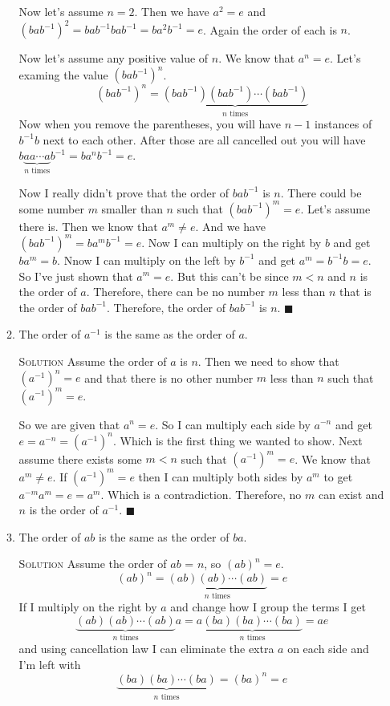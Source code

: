 \documentclass[twoside]{amsart}
\newcommand{\solution}{\textsc{Solution}\xspace}
\newcommand{\blank}{\vspace{5pt}}
\renewcommand{\qed}{\blacksquare}
\newcommand{\itm}{\blank\item}
\newcommand{\sol}{\blank\noindent\solution}
\begin{document}
\begin{enumerate}[A.]
\begin{enumerate}[1]
      Now let's assume $n=2$. Then we have $a^2 = e$ and
      $(bab^{-1})^2 = bab^{-1}bab^{-1} = ba^2b^{-1} = e$. Again
      the order of each is $n$.

      Now let's assume any positive value of $n$. We know that $a^n=e$.
      Let's examing the value $(bab^{-1})^n$.
      \[
         (bab^{-1})^n = \underbrace{(bab^{-1})(bab^{-1})\cdots
          (bab^{-1})}_{n\text{ times}}
      \]
      Now when you remove the parentheses, you will have $n-1$
      instances of $b^{-1}b$ next to each other. After those are
      all cancelled out you will have $b\underbrace{a a \cdots a}_{
      n\text{ times}}b^{-1} = ba^nb^{-1} = e$. 

      Now I really didn't prove that the order of $bab^{-1}$ is $n$.
      There could be some number $m$ smaller than $n$ such
      that $(bab^{-1})^m = e$. Let's assume there is. Then we know that
      $a^m \ne e$. And we have $(bab^{-1})^m = ba^mb^{-1} = e$. Now
      I can multiply on the right by $b$ and get $ba^m = b$. Nnow I
      can multiply on the left by $b^{-1}$ and get $a^m = b^{-1}b = e$.
      So I've just shown that $a^m = e$. But this can't be since $m < n$
      and $n$ is the order of $a$. Therefore, there can be no number
      $m$ less than $n$ that is the order of $bab^{-1}$. Therefore,
      the order of $bab^{-1}$ is $n$. $\qed$

      \itm The order of $a^{-1}$ is the same as the order of $a$.

      \sol Assume the order of $a$ is $n$. Then we need to show that
      $(a^{-1})^n = e$ and that there is no other number $m$ less than $n$
      such that $(a^{-1})^m = e$.

      So we are given that $a^n = e$. So I can multiply each side
      by $a^{-n}$ and get $e = a^{-n} = (a^{-1})^n$. Which is the
      first thing we wanted to show. Next assume there exists some
      $m < n$ such that $(a^{-1})^m = e$. We know that $a^m \ne e$.
      If $(a^{-1})^m = e$ then I can multiply both sides by $a^m$
      to get $a^{-m}a^m = e = a^m$. Which is a contradiction. Therefore,
      no $m$ can exist and $n$ is the order of $a^{-1}$. $\qed$

      \itm The order of $ab$ is the same as the order of $ba$.

      \sol Assume the order of $ab$ = $n$, so $(ab)^n = e$. 
      \[
         (ab)^n = \underbrace{(ab)(ab) \cdots (ab)}_{n\text{ times}} = e
      \]
      If I multiply on the right by $a$ and change how I group the
      terms I get
      \[
         \underbrace{(ab)(ab) \cdots (ab)}_{n\text{ times}} a =
            a\underbrace{(ba)(ba) \cdots (ba)}_{n\text{ times}} = ae
      \]
      and using cancellation law I can eliminate the extra $a$ on
      each side and I'm left with
      \[
         \underbrace{(ba)(ba) \cdots (ba)}_{n\text{ times}} = (ba)^n = e
      \]


\end{enumerate}
\end{enumerate}
\end{document}
